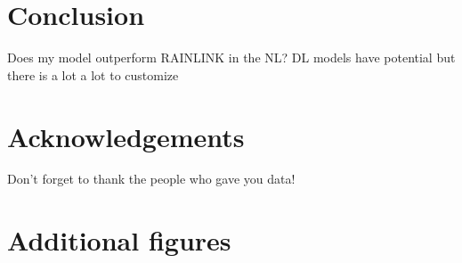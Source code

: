 \documentclass[twocolumn, 10pt, a4paper]{memoir}
\begin{document}
	\chapter{Conclusion} \label{ch: conclusion}
	Does my model outperform RAINLINK in the NL?
	DL models have potential but there is a lot a lot to customize
	
	
	
	\chapter*{Acknowledgements}\vspace{-6mm}       %
	
	Don't forget to thank the people who gave you data!
	
	
	
	\renewcommand{\bibname}{Bibliography}
	
	
	
	
	
	
	\appendix
	\chapter{Additional figures}
	
	
	
	
\end{document}
